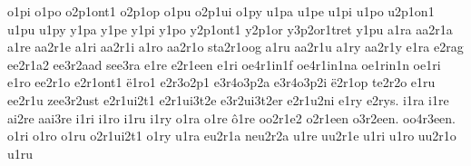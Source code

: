 {%
o1pi
o1po
o2p1ont1
o2p1op
o1pu
o2p1ui
o1py
%
u1pa
u1pe
u1pi
u1po
u2p1on1
u1pu
u1py
%
y1pa
y1pe
y1pi
y1po
y2p1ont1
y2p1or
y3p2or1tret
y1pu
%
%
a1ra
aa2r1a
a1re
aa2r1e
a1ri
aa2r1i
a1ro
aa2r1o
sta2r1oog
a1ru
aa2r1u
a1ry
aa2r1y
%
%
e1ra
e2rag
ee2r1a2
ee3r2aad
see3ra
e1re
e2r1een
e1ri
oe4r1in1f
oe4r1in1na
oe1rin1n
oe1ri
e1ro
ee2r1o
e2r1ont1
ë1ro1
e2r3o2p1
e3r4o3p2a
e3r4o3p2i
ë2r1op
te2r2o
e1ru
ee2r1u
zee3r2ust
e2r1ui2t1
e2r1ui3t2e
e3r2ui3t2er
e2r1u2ni
e1ry
e2rys.
%
i1ra
i1re
ai2re
aai3re
i1ri
i1ro
i1ru
i1ry
%
o1ra
o1re
ô1re
oo2r1e2
o2r1een
o3r2een.
oo4r3een.
o1ri
o1ro
o1ru
o2r1ui2t1
o1ry
%
u1ra
eu2r1a
neu2r2a
u1re
uu2r1e
u1ri
u1ro
uu2r1o
u1ru
}
